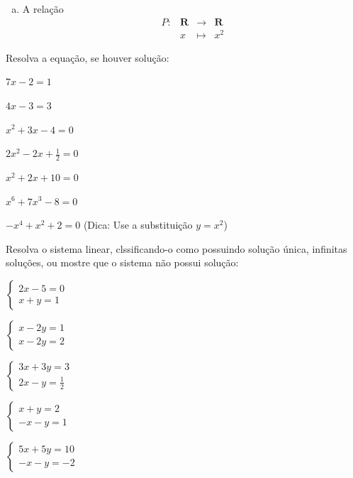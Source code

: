 \begin{secaoexercicio}
\begin{xca}
\begin{enumerate}[(a)]
\item A relação
$$\begin{array}{crcl}
P:&\mathbf{R}&\rightarrow& \mathbf{R} \\
&x&\mapsto& x^2\end{array}$$
\end{enumerate}

\end{xca}

\begin{xca}  Resolva a equação, se houver solução:
\begin{colexercicio}{3}
\item $7x-2=1$
\item $4x-3=3$
\item $x^2+3x-4=0$
\item $2x^2-2x+\frac{1}{2}=0$
\item $x^2+2x+10=0$
\item $x^6+7x^3-8=0$
\item $-x^4+x^2+2=0$ (Dica: Use a substituição $y=x^2$)
\end{colexercicio}
\end{xca}

\begin{xca} Resolva o sistema linear, clssificando-o como possuindo solução única, infinitas soluções,
 ou mostre que o sistema não possui solução:
\begin{colexercicio}{3}
\item
$\left\{\begin{array}{c}
2x-5=0\\
x+y=1
\end{array}\right.$
\item
$\left\{\begin{array}{c}
x-2y=1\\
x-2y=2
\end{array}\right.$
\item
$\left\{\begin{array}{c}
3x+3y=3\\
2x-y=\frac{1}{2}
\end{array}\right.$
\item
$\left\{\begin{array}{c}
x+y=2\\
-x-y=1
\end{array}\right.$
\item
$\left\{\begin{array}{c}
5x+5y=10\\
-x-y=-2
\end{array}\right.$
\end{colexercicio}
\end{xca}
\end{secaoexercicio}
